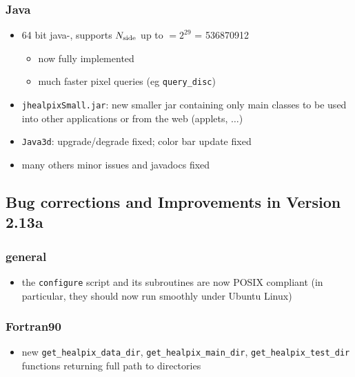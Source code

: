 \documentclass[12pt,twoside]{article}
\newcommand{\nside}{{N_{\rm side}}}
\begin{document}
%
\subsubsection[Java]{Java}
\begin{itemize}
	\item 64 bit java-\healpix, supports $\nside$ up to $ = 2^{29}$ = 536870912
	\begin{itemize}
		\item now fully implemented
		\item much faster pixel queries (eg {\tt query\_disc})
	\end{itemize}
	\item {\tt jhealpixSmall.jar}: new smaller jar containing only main
classes to be used into other applications or from the web (applets, $\ldots$)
	\item {\tt Java3d}: upgrade/degrade fixed; color bar update fixed
	\item many others minor issues and javadocs fixed
\end{itemize}
\subsection{Bug corrections and Improvements in Version 2.13a} %
%
\subsubsection[New General Improvements]{general}
\begin{itemize}
	\item the {\tt configure} script and its subroutines are now POSIX
compliant (in particular, they should now run smoothly under Ubuntu Linux)
\end{itemize}
%
\subsubsection[Fortran90]{Fortran90}
	\begin{itemize}
	\item new {\tt get\_healpix\_data\_dir}, 
	{\tt get\_healpix\_main\_dir},
	{\tt get\_healpix\_test\_dir} functions
	returning full path to \healpix directories
	\end{itemize}
%
\end{document}
